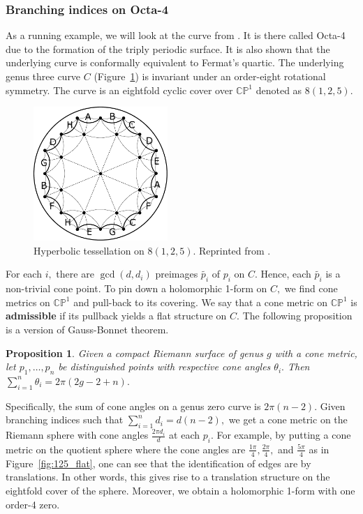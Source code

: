 \documentclass[12pt,reqno]{amsart}
\newtheorem*{proposition}{Proposition}
\theoremstyle{definition}
\theoremstyle{remark}
\begin{document}
\subsubsection*{Branching indices on Octa-4}
As a running example, we will look at the curve from \cite{dami}. It is there called Octa-4 due to the formation of the triply periodic surface. It is also shown that the underlying curve is conformally equivalent to Fermat's quartic. The underlying genus three curve $C$ (Figure~\ref{fig:125}) is invariant under an order-eight rotational symmetry. The curve is an eightfold cyclic cover over $\mathbb{C}\mathbb{P}^1$ denoted as $8 (1, 2, 5).$

\begin{figure}[htbp] 
   \centering
   \includegraphics[width=2in]{figures/125_base.pdf} 
  \caption{Hyperbolic tessellation on $8(1, 2, 5).$ Reprinted from \cite{dami}.}
  \label{fig:125}
\end{figure}


For each $i,$ there are $\gcd(d, d_i)$ preimages $\widetilde{p_i}$ of $p_i$ on $C.$ Hence, each $\widetilde{p_i}$ is a non-trivial cone point. To pin down a holomorphic 1-form on $C,$ we find cone metrics on $\mathbb{C}\mathbb{P}^1$ and pull-back to its covering. We say that a cone metric on $\mathbb{C}\mathbb{P}^1$ is \textbf{admissible} if its pullback yields a flat structure on $C.$ The following proposition is a version of Gauss-Bonnet theorem.

\begin{proposition} Given a compact Riemann surface of genus $g$ with a cone metric, let $p_1, \ldots, p_n$ be distinguished points with respective cone angles $\theta_i.$ Then $\sum\limits_{i=1}^n \theta_i = 2 \pi (2 g - 2 + n).$
\end{proposition}

Specifically, the sum of cone angles on a genus zero curve is $2 \pi (n - 2).$ Given branching indices such that $\sum\limits_{i=1}^n d_i = d (n - 2),$ we get a cone metric on the Riemann sphere with cone angles $\frac{2 \pi d_i}{d}$ at each $p_i.$ For example, by putting a cone metric on the quotient sphere where the cone angles are $\frac{1 \pi}{4}, \frac{2 \pi}{4},$ and $\frac{5 \pi}{4}$ as in Figure~\ref{fig:125_flat}, one can see that the identification of edges are by translations. In other words, this gives rise to a translation structure on the eightfold cover of the sphere. Moreover, we obtain a holomorphic 1-form with one order-4 zero.
\end{document}
